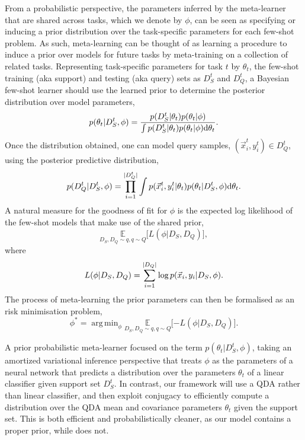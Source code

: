 \documentclass[10pt,twocolumn,letterpaper]{article}
\DeclareMathOperator*{\argmin}{arg\,min}
\begin{document}
From a probabilistic perspective, the parameters inferred by the meta-learner that are shared across tasks, which we denote by $\phi$, can be seen as specifying or inducing a prior distribution over the task-specific parameters for each few-shot problem. As such, meta-learning can be thought of as learning a procedure to induce a prior over models for future tasks by meta-training on a collection of related tasks. Representing task-specific parameters for task $t$ by $\theta_t$, the few-shot training (aka support) and testing (aka query) sets as $D_S^t$ and $D^t_Q$, a Bayesian few-shot learner should use the learned prior to determine the posterior distribution over model parameters,
\begin{equation}
\label{eq:parameter-posterior}
    p(\theta_t | D_S^t, \phi) = \frac{p(D_S^t | \theta_t) p(\theta_t | \phi)}{\int p(D_S^t | \theta_t) p(\theta_t | \phi) \textup{d}\theta_t}.
\end{equation}
Once the distribution obtained, one can model query samples, $(\vec x_i^t, y_i^t)\in D_Q^t$, using the posterior predictive distribution,
\begin{equation}
\label{eq:posterior-predictive}
    p(D_Q^t | D_S^t, \phi) = \prod_{i=1}^{|D_Q^t|} \int p(\vec x_i^t, y_i^t | \theta_t) p(\theta_t | D_S^t, \phi) \textup{d}\theta_t.
\end{equation}
A natural measure for the goodness of fit for $\phi$ is the expected log likelihood of the few-shot models that make use of the shared prior,
\begin{equation}
    \underset{D_S, D_Q \sim q, q \sim Q}{\mathbb{E}} \lbrack L(\phi | D_S, D_Q) \rbrack,
\end{equation}
where
\begin{equation}
    L(\phi | D_S, D_Q) = \sum_{i=1}^{|D_Q|} \textup{log} \, p(\vec x_i, y_i | D_S, \phi).
\end{equation}
The process of meta-learning the prior parameters can then be formalised as an risk minimisation problem,
\begin{equation}
\label{eq:meta-objective}
    \phi^\ast = \argmin_{\phi} \underset{D_S, D_Q \sim q, q \sim Q}{\mathbb{E}} \lbrack -L(\phi | D_S, D_Q) \rbrack.
\end{equation}

 A prior probabilistic meta-learner \cite{gordon2019metaPred} focused on the term $p(\theta_t | D_S^t, \phi)$, taking an amortized variational inference perspective that treats $\phi$ as the parameters of a neural network that predicts a distribution over the parameters $\theta_t$ of a linear classifier given support set $D_S^t$. In contrast, our framework will use a QDA rather than linear classifier, and then exploit conjugacy to efficiently compute a distribution over the QDA mean and covariance parameters $\theta_t$ given the support set. This is both efficient and probabilistically cleaner, as our model contains a proper prior, while \cite{gordon2019metaPred}  does not.
\end{document}
